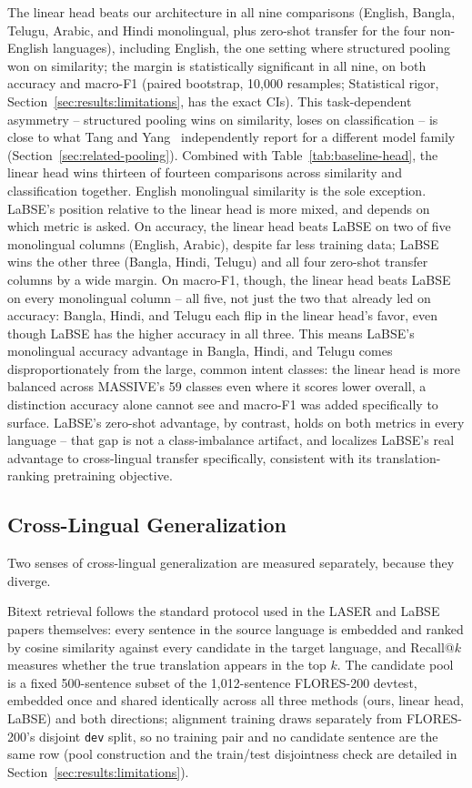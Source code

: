 \documentclass[manuscript]{acmart}
\begin{document}
The linear head beats our architecture in all nine comparisons (English, Bangla, Telugu, Arabic, and Hindi monolingual, plus zero-shot transfer for the four non-English languages), including English, the one setting where structured pooling won on similarity; the margin is statistically significant in all nine, on both accuracy and macro-F1 (paired bootstrap, 10,000 resamples; Statistical rigor, Section~\ref{sec:results:limitations}, has the exact CIs). This task-dependent asymmetry -- structured pooling wins on similarity, loses on classification -- is close to what Tang and Yang~\citep{tang2024poolingattention} independently report for a different model family (Section~\ref{sec:related-pooling}). Combined with Table~\ref{tab:baseline-head}, the linear head wins thirteen of fourteen comparisons across similarity and classification together. English monolingual similarity is the sole exception. LaBSE's position relative to the linear head is more mixed, and depends on which metric is asked. On accuracy, the linear head beats LaBSE on two of five monolingual columns (English, Arabic), despite far less training data; LaBSE wins the other three (Bangla, Hindi, Telugu) and all four zero-shot transfer columns by a wide margin. On macro-F1, though, the linear head beats LaBSE on every monolingual column -- all five, not just the two that already led on accuracy: Bangla, Hindi, and Telugu each flip in the linear head's favor, even though LaBSE has the higher accuracy in all three. This means LaBSE's monolingual accuracy advantage in Bangla, Hindi, and Telugu comes disproportionately from the large, common intent classes: the linear head is more balanced across MASSIVE's 59 classes even where it scores lower overall, a distinction accuracy alone cannot see and macro-F1 was added specifically to surface. LaBSE's zero-shot advantage, by contrast, holds on both metrics in every language -- that gap is not a class-imbalance artifact, and localizes LaBSE's real advantage to cross-lingual transfer specifically, consistent with its translation-ranking pretraining objective.

\subsection{Cross-Lingual Generalization}
\label{sec:results:crosslingual}

Two senses of cross-lingual generalization are measured separately, because they diverge.

Bitext retrieval follows the standard protocol used in the LASER and LaBSE papers themselves: every sentence in the source language is embedded and ranked by cosine similarity against every candidate in the target language, and Recall@$k$ measures whether the true translation appears in the top $k$. The candidate pool is a fixed 500-sentence subset of the 1,012-sentence FLORES-200 devtest, embedded once and shared identically across all three methods (ours, linear head, LaBSE) and both directions; alignment training draws separately from FLORES-200's disjoint \texttt{dev} split, so no training pair and no candidate sentence are the same row (pool construction and the train/test disjointness check are detailed in Section~\ref{sec:results:limitations}).
\end{document}
